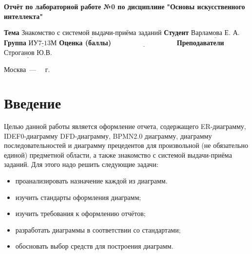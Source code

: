 \documentclass[12pt]{report}
\begin{document}
\begin{titlepage}
	
	\begin{center}
		\noindent\begin{minipage}{1.3\textwidth}\centering
			\Large\textbf{  Отчёт по лабораторной работе №0 по дисциплине}\newline
			\textbf{ "Основы искусственного интеллекта"}\newline\newline
		\end{minipage}
	\end{center}
	
	\noindent\textbf{Тема} $\underline{\text{Знакомство с системой выдачи-приёма заданий}}$\newline\newline
	\noindent\textbf{Студент} $\underline{\text{Варламова Е. А.}}$\newline\newline
	\noindent\textbf{Группа} $\underline{\text{ИУ7-13М}}$\newline\newline
	\noindent\textbf{Оценка (баллы)} $\underline{\text{~~~~~~~~~~~~~~~~~~~~~~~~~~~}}$\newline\newline
	\noindent\textbf{Преподаватели} $\underline{\text{Строганов Ю.В.}}$\newline\newline\newline
	
	\begin{center}
		\vfill
		Москва~---~\the\year
		~г.
	\end{center}
\end{titlepage}
\large
\setcounter{page}{2}
\def\contentsname{СОДЕРЖАНИЕ}
\renewcommand{\contentsname}{СОДЕРЖАНИЕ}
\tableofcontents
\renewcommand\labelitemi{---}
\newpage
\chapter*{Введение}

Целью данной работы является оформление отчета, содержащего ER-диаграмму, IDEF0-диаграмму DFD-диаграмму, BPMN2.0 диаграмму, диаграмму последовательностей и диаграмму прецедентов для произвольной (не обязательно единой) предметной области, а также знакомство с системой выдачи-приёма заданий. 
Для этого надо решить следующие задачи:
\begin{itemize}
    \item проанализировать назначение каждой из диаграмм.
    \item изучить стандарты оформления диаграмм;
    \item изучить требования к оформлению отчётов;
    \item разработать диаграммы в соответствии со стандартами;
    \item обосновать выбор средств для построения диаграмм.
\end{itemize}
\end{document}

